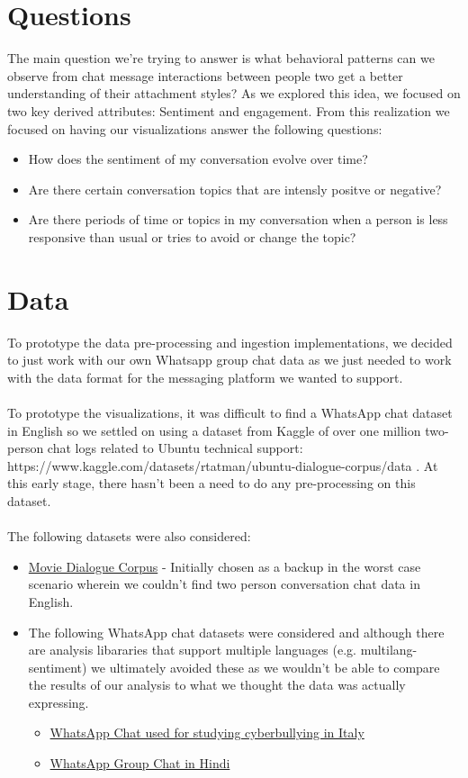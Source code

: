 \documentclass{article}\usepackage{graphicx}
\begin{document}
\section*{Questions}
The main question we're trying to answer is what behavioral patterns can we observe from chat message interactions between people two get a better understanding of their attachment styles? As we explored this idea, we focused on two key derived attributes: Sentiment and engagement. From this realization we focused on having our visualizations answer the following questions:
\begin{itemize}
    \item How does the sentiment of my conversation evolve over time?
    \item Are there certain conversation topics that are intensly positve or negative? 
    \item Are there periods of time or topics in my conversation when a person is less responsive than usual or tries to avoid or change the topic? 
\end{itemize}

\section*{Data}
To prototype the data pre-processing and ingestion implementations, we decided to just work with our own Whatsapp group chat data as we just needed to work with the data format for the messaging platform we wanted to support. 
\\\\ To prototype the visualizations, it was difficult to find a WhatsApp chat dataset in English so we settled on using a dataset from Kaggle of over one million two-person chat logs related to Ubuntu technical support: https://www.kaggle.com/datasets/rtatman/ubuntu-dialogue-corpus/data . At this early stage, there hasn't been a need to do any pre-processing on this dataset. 
\\\\ The following datasets were also considered:
\begin{itemize}
    \item \href{https://github.com/dhfbk/WhatsApp-Dataset}{Movie Dialogue Corpus} - Initially chosen as a backup in the worst case scenario wherein we couldn't find two person conversation chat data in English. 
    \item The following WhatsApp chat datasets were considered and although there are analysis libararies that support multiple languages (e.g. multilang-sentiment) we ultimately avoided these as we wouldn't be able to compare the results of our analysis to what we thought the data was actually expressing. 
    \begin{itemize}
        \item \href{https://www.kaggle.com/datasets/Cornell-University/movie-dialog-corpus/data}{WhatsApp Chat used for studying cyberbullying in Italy}
        \item \href{https://www.kaggle.com/datasets/mmuhammetcavus/whatsapp-chat/data}{WhatsApp Group Chat in Hindi}
    \end{itemize}
\end{itemize}
\end{document}
